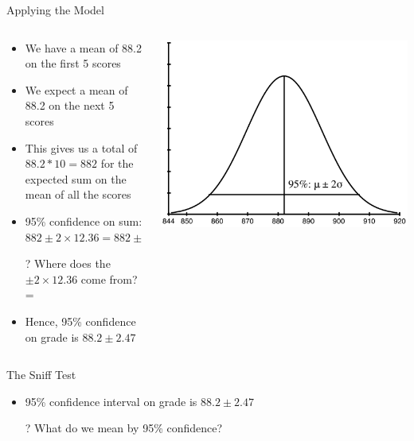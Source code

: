 \documentclass[aspectratio=169]{beamer}
\begin{document}
\begin{frame}{Applying the Model}

\begin{columns}[c]
\begin{column}{0.6\textwidth}
\begin{itemize}
	\item We have a mean of 88.2 on the first 5 scores
	\item We expect a mean of 88.2 on the next 5 scores
	\item This gives us a total of $88.2 * 10 = 882$ for the expected sum on the mean of all the scores
	\item 95\% confidence on sum: $882 \pm 2 \times 12.36 = 882 \pm 24.7$
	\item[?] Where does the $\pm 2 \times 12.36$ come from? %
=	\item Hence, 95\% confidence on grade is $88.2 \pm 2.47$
\end{itemize}
\end{column}
\begin{column}{0.4\textwidth}
\includegraphics[width=1\textwidth]{lectModel1/normalScoresV2.pdf}
\end{column}
\end{columns}
\end{frame}
\begin{frame}{The Sniff Test}
\begin{itemize}
\item 95\% confidence interval on grade is $88.2 \pm 2.47$
\item[?] What do we mean by 95\% confidence?
\end{itemize}
\end{frame}
\end{document}
